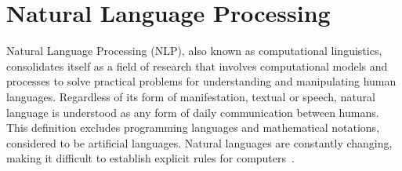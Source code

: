 \documentclass{ieeeaccess}
\begin{document}

\section{Natural Language Processing}
\label{sec:nlp}

Natural Language Processing (NLP), also known as computational linguistics, consolidates itself as a field of research that involves computational models and processes to solve practical problems for understanding and manipulating human languages. Regardless of its form of manifestation, textual or speech, natural language is understood as any form of daily communication between humans. This definition excludes programming languages and mathematical notations, considered to be artificial languages. Natural languages are constantly changing, making it difficult to establish explicit rules for computers~\cite{clark2012automatically,otter2020survey,bird2009natural}.
\end{document}
